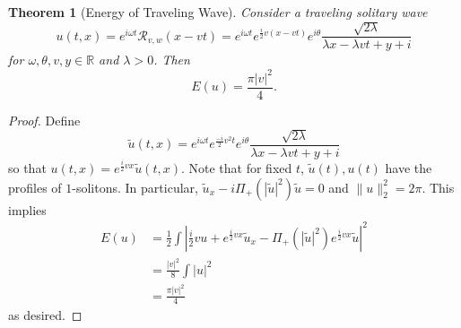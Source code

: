 \documentclass{amsart}
\newtheorem{theorem}{Theorem}[section]
\theoremstyle{definition}
\newcommand\R{\mathbb{R}}
\renewcommand{\(}{\left(}
\renewcommand{\)}{\right)}
\begin{document}
\begin{theorem}[Energy of Traveling Wave]
    Consider a traveling solitary wave
    \begin{equation*}
        u(t,x) = e^{i \omega t} \mathcal{R}_{v,w}(x - vt) = e^{i\omega t}e^{\frac{i}{2} v(x-vt)} e^{i\theta} \frac{\sqrt{2\lambda}}{\lambda x - \lambda vt + y + i}
    \end{equation*}
    for $\omega,\theta,v,y \in \R$ and $\lambda > 0$. Then
    \begin{equation*}
        E(u) = \frac{\pi|v|^2}{4}.
    \end{equation*}
\end{theorem}
\begin{proof}
    Define
    \begin{equation*}
        \tilde{u}(t,x) = e^{i\omega t}e^{\frac{-i}{2}v^2t} e^{i\theta} \frac{\sqrt{2\lambda}}{\lambda x - \lambda vt + y + i}
    \end{equation*}
    so that $u(t,x) = e^{\frac{i}{2} v x} \tilde{u}(t,x)$. Note that for fixed $t$, $\tilde{u}(t),u(t)$ have the profiles of $1$-solitons. In particular, $\tilde{u}_x - i \Pi_+(|\tilde{u}|^2)\tilde{u} = 0$ and $\|u\|_2^2 = 2\pi$. This implies
    \begin{align*}
        E(u) & = \frac{1}{2} \int \left|\frac{i}{2} v u + e^{\frac{i}{2} vx} \tilde{u}_x - \Pi_+ \(|\tilde{u}|^2\)e^{\frac{i}{2} vx} \tilde{u} \right|^2 \\
        & = \frac{|v|^2}{8} \int \left|u \right|^2 \\
        & = \frac{\pi |v|^2}{4}
    \end{align*}
    as desired.
\end{proof}
\end{document}
